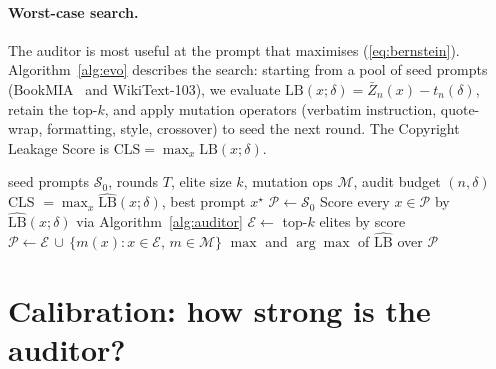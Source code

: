 \documentclass{article}
\begin{document}
\paragraph{Worst-case search.}
The auditor is most useful at the prompt that maximises (\ref{eq:bernstein}).  Algorithm~\ref{alg:evo} describes the search: starting from a pool of seed prompts (BookMIA~\cite{shi2024bookmia} and WikiText-103), we evaluate $\mathrm{LB}(x;\delta)=\bar Z_n(x)-t_n(\delta)$, retain the top-$k$, and apply mutation operators (verbatim instruction, quote-wrap, formatting, style, crossover) to seed the next round.  The Copyright Leakage Score is $\mathrm{CLS}=\max_{x}\mathrm{LB}(x;\delta)$.

\begin{algorithm}[H]
\caption{Evolutionary adversarial prompt search}
\label{alg:evo}
\small
\begin{algorithmic}[1]
\Require seed prompts $\mathcal{S}_0$, rounds $T$, elite size $k$, mutation ops $\mathcal{M}$, audit budget $(n,\delta)$
\Ensure CLS $=\max_x \widehat{\mathrm{LB}}(x;\delta)$, best prompt $x^\star$
\State $\mathcal{P}\gets \mathcal{S}_0$
  \State Score every $x\in\mathcal{P}$ by $\widehat{\mathrm{LB}}(x;\delta)$ via Algorithm~\ref{alg:auditor}
  \State $\mathcal{E}\gets$ top-$k$ elites by score
  \State $\mathcal{P}\gets \mathcal{E}\,\cup\,\{m(x): x\in\mathcal{E},\,m\in\mathcal{M}\}$ 
\EndFor
\State \Return $\max$ and $\arg\max$ of $\widehat{\mathrm{LB}}$ over $\mathcal{P}$
\end{algorithmic}
\end{algorithm}


\section{Calibration: how strong is the auditor?}
\label{sec:calibration}
\end{document}
